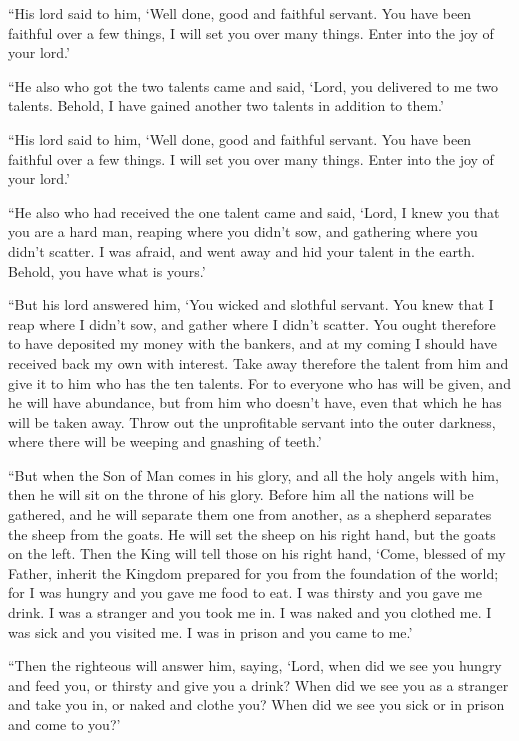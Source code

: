  ``His lord said to him, `Well done, good and faithful
servant. You have been faithful over a few things, I will set you over
many things. Enter into the joy of your lord.'

 ``He also who got the two talents came and said, `Lord,
you delivered to me two talents. Behold, I have gained another two
talents in addition to them.'

 ``His lord said to him, `Well done, good and faithful
servant. You have been faithful over a few things. I will set you over
many things. Enter into the joy of your lord.'

 ``He also who had received the one talent came and said,
`Lord, I knew you that you are a hard man, reaping where you didn't sow,
and gathering where you didn't scatter.  I was afraid,
and went away and hid your talent in the earth. Behold, you have what is
yours.'

 ``But his lord answered him, `You wicked and slothful
servant. You knew that I reap where I didn't sow, and gather where I
didn't scatter.  You ought therefore to have deposited my
money with the bankers, and at my coming I should have received back my
own with interest.  Take away therefore the talent from
him and give it to him who has the ten talents.  For to
everyone who has will be given, and he will have abundance, but from him
who doesn't have, even that which he has will be taken away.
 Throw out the unprofitable servant into the outer
darkness, where there will be weeping and gnashing of teeth.'

 ``But when the Son of Man comes in his glory, and all
the holy angels with him, then he will sit on the throne of his glory.
 Before him all the nations will be gathered, and he will
separate them one from another, as a shepherd separates the sheep from
the goats.  He will set the sheep on his right hand, but
the goats on the left.  Then the King will tell those on
his right hand, `Come, blessed of my Father, inherit the Kingdom
prepared for you from the foundation of the world;  for I
was hungry and you gave me food to eat. I was thirsty and you gave me
drink. I was a stranger and you took me in.  I was naked
and you clothed me. I was sick and you visited me. I was in prison and
you came to me.'

 ``Then the righteous will answer him, saying, `Lord,
when did we see you hungry and feed you, or thirsty and give you a
drink?  When did we see you as a stranger and take you
in, or naked and clothe you?  When did we see you sick or
in prison and come to you?'

